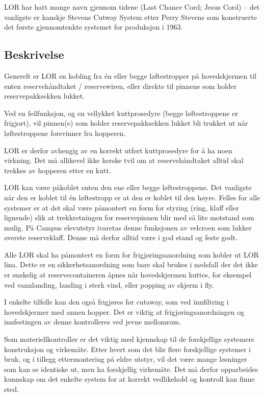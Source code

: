 LOR har hatt mange navn gjennom tidene (Last Chance Cord; Jesus Cord) – det vanligste er kanskje Stevens Cutway System etter Perry Stevens som konstruerte det første gjennomtenkte systemet for produksjon i 1963.

\subsection{Beskrivelse}
Generelt er LOR en kobling fra én eller begge løftestropper på hovedskjermen til enten reservehåndtaket / reservewiren, eller direkte til pinnene som holder reservepakksekken lukket.

Ved en feilfunksjon, og en vellykket kuttprosedyre (begge løftestroppene er frigjort), vil pinnen(e) som holder reservepakksekken lukket bli trukket ut når løftestroppene forsvinner fra hopperen.

LOR er derfor avhengig av en korrekt utført kuttprosedyre for å ha noen virkning. Det må allikevel ikke herske tvil om at reservehåndtaket alltid skal trekkes av hopperen etter en kutt.

LOR kan være påkoblet enten den ene eller begge løftestroppene. Det vanligste når den er koblet til én løftestropp er at den er koblet til den høyre. Felles for alle systemer er at det skal være påmontert en form for styring (ring, klaff eller lignende) slik at trekkretningen for reservepinnen blir med så lite motstand som mulig. På Campus elevutstyr ivaretas denne funksjonen av velcroen som lukker øverste reserveklaff. Denne må derfor alltid være i god stand og feste godt.

Alle LOR skal ha påmontert en form for frigjøringsanordning som kobler ut LOR lina. Dette er en sikkerhetsanordning som bare skal brukes i nødsfall der det ikke er ønskelig at reservecontaineren åpnes når hovedskjermen kuttes, for eksempel ved vannlanding, landing i sterk vind, eller popping av skjerm i fly.

I enkelte tilfelle kan den også frigjøres før cutaway, som ved innfiltring i hovedskjermer med annen hopper. Det er viktig at frigjøringsanordningen og innfestingen av denne kontrolleres ved jevne mellomrom.

Som materiellkontrollør er det viktig med kjennskap til de forskjellige systemers konstruksjon og virkemåte. Etter hvert som det blir flere forskjellige systemer i bruk, og i tillegg ettermontering på eldre utstyr, vil det være mange løsninger som kan se identiske ut, men ha forskjellig virkemåte. Det må derfor opparbeides kunnskap om det enkelte system for at korrekt vedlikehold og kontroll kan finne sted.

